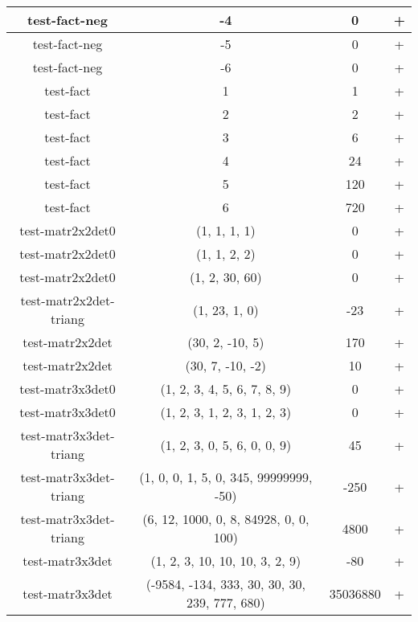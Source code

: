 \begin{tabular}{ |c|c|c|c| }
  test-fact-neg & -4 & 0 & + \\ 
  \hline
  test-fact-neg & -5 & 0 & + \\ 
  \hline
  test-fact-neg & -6 & 0 & + \\ 
  \hline
  test-fact & 1 & 1 & + \\ 
  \hline
  test-fact & 2 & 2 & + \\ 
  \hline
  test-fact & 3 & 6 & + \\ 
  \hline
  test-fact & 4 & 24 & + \\ 
  \hline
  test-fact & 5 & 120 & + \\ 
  \hline
  test-fact & 6 & 720 & + \\ 
  \hline
  test-matr2x2det0 & (1, 1, 1, 1) & 0 & + \\ 
  \hline
  test-matr2x2det0 & (1, 1, 2, 2) & 0 & + \\ 
  \hline
  test-matr2x2det0 & (1, 2, 30, 60) & 0 & + \\ 
  \hline
  test-matr2x2det-triang & (1, 23, 1, 0) & -23 & + \\ 
  \hline
  test-matr2x2det & (30, 2, -10, 5) & 170 & + \\ 
  \hline
  test-matr2x2det & (30, 7, -10, -2) & 10 & + \\ 
  \hline
  test-matr3x3det0 & (1, 2, 3, 4, 5, 6, 7, 8, 9) & 0 & + \\ 
  \hline
  test-matr3x3det0 & (1, 2, 3, 1, 2, 3, 1, 2, 3) & 0 & + \\ 
  \hline
  test-matr3x3det-triang & (1, 2, 3, 0, 5, 6, 0, 0, 9) & 45 & + \\ 
  \hline
  test-matr3x3det-triang & (1, 0, 0, 1, 5, 0, 345, 99999999, -50) & -250 & + \\ 
  \hline
  test-matr3x3det-triang & (6, 12, 1000, 0, 8, 84928, 0, 0, 100) & 4800 & + \\ 
  \hline
  test-matr3x3det& (1, 2, 3, 10, 10, 10, 3, 2, 9) & -80 & + \\ 
  \hline
  test-matr3x3det& (-9584, -134, 333, 30, 30, 30, 239, 777, 680) & 35036880 & + \\ 
  \hline
 \end{tabular}
